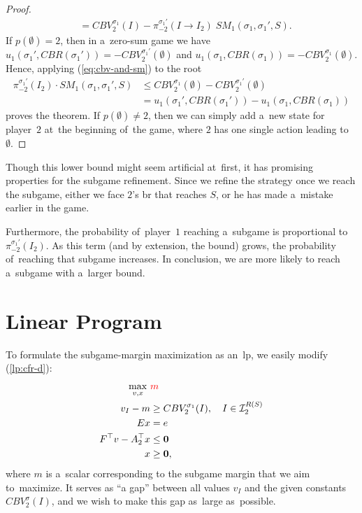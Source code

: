 \begin{proof}
\begin{align*}
    &= CBV_2^{\sigma_1}(I) - \pi^{\sigma_1'}_{-2}(I \to I_2) \; SM_1(\sigma_1 , \sigma_1', S).
  \end{align*}
  If $p(\emptyset) = 2$, then in a~zero-sum game we have $u_1(\sigma_1', CBR(\sigma_1')) = -CBV_2^{\sigma_1'}(\emptyset)$ and
  $u_1(\sigma_1, CBR(\sigma_1)) = -CBV_2^{\sigma_1}(\emptyset)$.
  Hence, applying (\ref{eq:cbv-and-sm}) to the root
  \begin{align*}
    \pi^{\sigma_1'}_{-2}(I_2) \cdot SM_1(\sigma_1 , \sigma_1', S)
    &\le CBV_2^{\sigma_1}(\emptyset) - CBV_2^{\sigma_1'}(\emptyset) \\
    &= u_1(\sigma_1', CBR(\sigma_1')) - u_1(\sigma_1, CBR(\sigma_1))
  \end{align*}
  proves the theorem.
  If $p(\emptyset) \ne 2$, then we can simply add a~new state for player~$2$ at~the beginning of~the game, where $2$ has one single action leading to~$\emptyset$.
\end{proof}
Though this lower bound might seem artificial at~first, it has promising properties for the subgame refinement.
Since we refine the strategy once we reach the subgame, either we face $2$'s \acrlong{br} that reaches $S$, or he has made a~mistake earlier in the game.

Furthermore, the probability of~player~$1$ reaching a~subgame is proportional to $\pi_{-2}^{\sigma_1'}(I_2)$.
As this term (and by extension, the bound) grows, the probability of~reaching that subgame increases.
In conclusion, we are more likely to reach a~subgame with a~larger bound.

\section{Linear Program}
To formulate the subgame-margin maximization as an~\acrshort{lp}, we easily modify (\ref{lp:cfr-d}):
\begin{equation}
  \label{lp:max-margin}
  \begin{split}
    \max_{v, x}\ &\textcolor{red}{m} \\
    v_I - m &\ge CBV_2^{\sigma_1}(I), \quad I \in \mathcal{I}_2^{R(S)}\\ 
    Ex &= e \\
    F^\top v - A_2^\top x &\le \boldsymbol{0} \\
    x &\ge \boldsymbol{0},
  \end{split}
\end{equation}
where $m$ is a~scalar corresponding to the subgame margin that we aim to~maximize.
It serves as ``a gap'' between all values $v_I$ and the given constants $CBV_2^\sigma(I)$, and we wish to make this gap as~large as~possible.

